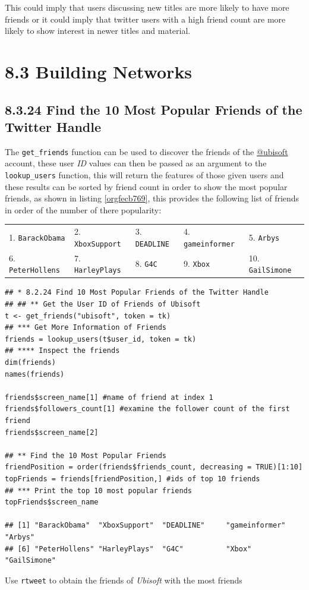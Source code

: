 \documentclass[11pt]{article}
\begin{document}
This could imply that users discussing new titles are more likely to have more friends or it could imply that twitter users with a high friend count are more likely to show interest in newer titles and material.
\section{8.3 Building Networks}
\label{sec:org1bee2cc}
\subsection{8.3.24 Find the 10 Most Popular Friends of the Twitter Handle}
\label{sec:org297825b}
The \texttt{get\_friends} function can be used to discover the friends of the \href{https://twitter.com/Ubisoft}{@ubisoft}
account, these user \emph{ID} values can then be passed as an argument to the
\texttt{lookup\_users} function, this will return the features of those given users and
these results can be sorted by friend count in order to show the most popular
friends, as shown in listing \ref{orgfecb769}, this provides the following list of friends in
order of the number of there popularity:

\begin{center}
\begin{tabular}{lllll}
1. \texttt{BarackObama} & 2.  \texttt{XboxSupport} & 3. \texttt{DEADLINE} & 4.  \texttt{gameinformer} & 5.  \texttt{Arbys}\\
6.  \texttt{PeterHollens} & 7.  \texttt{HarleyPlays} & 8. \texttt{G4C} & 9.  \texttt{Xbox} & 10. \texttt{GailSimone}\\
\end{tabular}
\end{center}


\begin{listing}[htbp]
\begin{verbatim}
## * 8.2.24 Find 10 Most Popular Friends of the Twitter Handle
## ## ** Get the User ID of Friends of Ubisoft
t <- get_friends("ubisoft", token = tk)
## *** Get More Information of Friends
friends = lookup_users(t$user_id, token = tk)
## **** Inspect the friends
dim(friends)
names(friends)

friends$screen_name[1] #name of friend at index 1
friends$followers_count[1] #examine the follower count of the first friend
friends$screen_name[2]

## ** Find the 10 Most Popular Friends
friendPosition = order(friends$friends_count, decreasing = TRUE)[1:10]
topFriends = friends[friendPosition,] #ids of top 10 friends
## *** Print the top 10 most popular friends
topFriends$screen_name

## [1] "BarackObama"  "XboxSupport"  "DEADLINE"     "gameinformer" "Arbys"
## [6] "PeterHollens" "HarleyPlays"  "G4C"          "Xbox"         "GailSimone"
\end{verbatim}
\caption{\label{orgfecb769}Use \texttt{rtweet} to obtain the friends of \emph{Ubisoft} with the most friends}
\end{listing}
\end{document}
